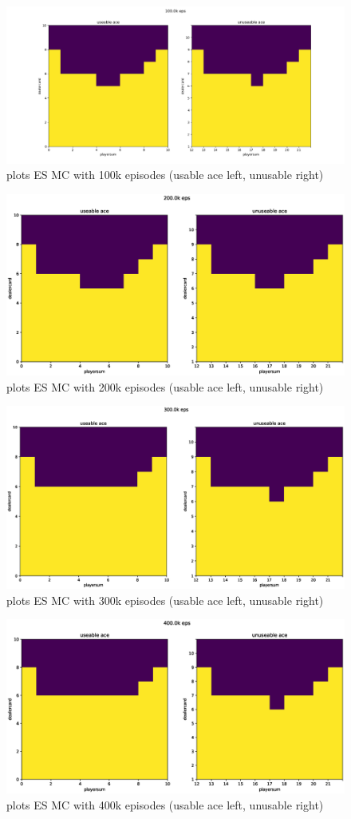 \documentclass[11pt,a4paper]{article}
\begin{document}
\begin{figure}[h!]
  \includegraphics[width=.7\textwidth]{100k.png}
  \centering
  \caption{plots ES MC with 100k episodes (usable ace left, unusable right)}
  \label{fig4}
\end{figure}

\begin{figure}[h!]
  \includegraphics[width=.7\textwidth]{200k.eps}
  \centering
  \caption{plots ES MC with 200k episodes (usable ace left, unusable right)}
  \label{fig5}
\end{figure}

\begin{figure}[h!]
  \includegraphics[width=.7\textwidth]{300k.eps}
  \centering
  \caption{plots ES MC with 300k episodes (usable ace left, unusable right)}
  \label{fig6}
\end{figure}

\begin{figure}[h!]
  \includegraphics[width=.7\textwidth]{400k.eps}
  \centering
  \caption{plots ES MC with 400k episodes (usable ace left, unusable right)}
  \label{fig7}
\end{figure}
\end{document}
